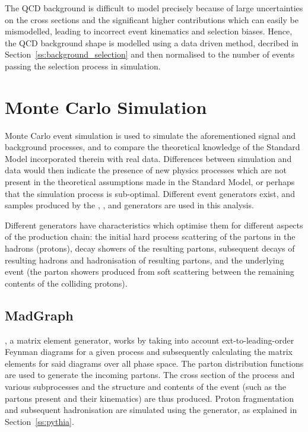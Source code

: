 The QCD background is difficult to model precisely because of large uncertainties on the cross sections and
the significant higher contributions which can easily be mismodelled, leading to incorrect event kinematics
and selection biases. Hence, the QCD background shape is modelled using a data driven method, decribed in
Section~\ref{ss:background_selection} and then normalised to the number of events passing the selection
process in simulation.

\section{Monte Carlo Simulation}
\label{s:monte_carlo_simulation}

Monte Carlo event simulation is used to simulate the aforementioned signal and background processes, and to
compare the theoretical knowledge of the Standard Model incorporated therein with real data. Differences
between simulation and data would then indicate the presence of new physics processes which are not present in
the theoretical assumptions made in the Standard Model, or perhaps that the simulation process is sub-optimal.
Different event generators exist, and samples produced by the \MADGRAPH, \PYTHIA, \POWHEG and \HERWIG
generators are used in this analysis.

Different generators have characteristics which optimise them for different aspects of the production chain:
the initial hard process scattering of the partons in the hadrons (protons), decay showers of the resulting
partons, subsequent decays of resulting hadrons and hadronisation of resulting partons, and the underlying
event (the parton showers produced from soft scattering between the remaining contents of the colliding
protons). 

\subsection{MadGraph}
\label{ss:madgraph}
\MADGRAPH \cite{madgraph5}, a matrix element generator, works by taking into account ext-to-leading-order
Feynman diagrams for a given process and subsequently calculating the matrix elements for said diagrams over
all phase space. The parton distribution functions are used to generate the incoming partons.
The cross section of the process and various subprocesses and the structure and contents of the event (such as
the partons present and their kinematics) are thus produced. %
Proton fragmentation and subsequent hadronisation are simulated using the \PYTHIA generator, as explained in
Section~\ref{ss:pythia}.

